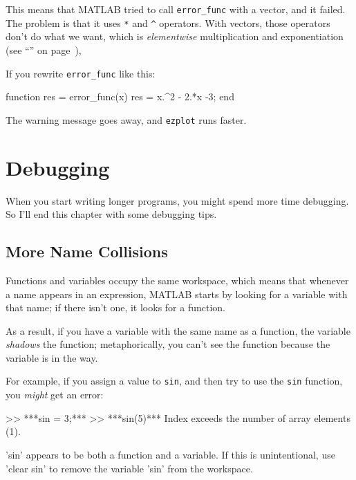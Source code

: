 This means that MATLAB tried to call \verb"error_func" with a vector, and it failed. 
The problem is that it uses \verb"*" and \verb"^" operators.  With vectors, those operators don't do what we want, which is {\em elementwise} multiplication and exponentiation
(see ``'' on page~\pageref{elementwise}),


If you rewrite \verb"error_func" like this:

\begin{code}
function res = error_func(x)
    res = x.^2 - 2.*x -3;
end
\end{code}

The warning message goes away, and {\tt ezplot} runs faster.


\section{Debugging}

When you start writing longer programs, you might spend more time debugging.  So I'll end this chapter with some debugging tips.

\subsection{More Name Collisions}

Functions and variables occupy the same workspace, which means
that whenever a name appears in an expression, MATLAB starts by looking
for a variable with that name; if there isn't one, it looks for
a function.


As a result, if you have a variable with the same name as a function,
the variable {\em shadows} the function; metaphorically, you can't see the function because the variable is in the way.  

For example, if you assign
a value to {\tt sin}, and then try to use the {\tt sin} function, you
{\em might} get an error:

\begin{code}
>> ***sin = 3;***
>> ***sin(5)***
Index exceeds the number of array elements (1).

'sin' appears to be both a function and a variable.
If this is unintentional, use 'clear sin' to remove 
the variable 'sin' from the workspace.
\end{code}

